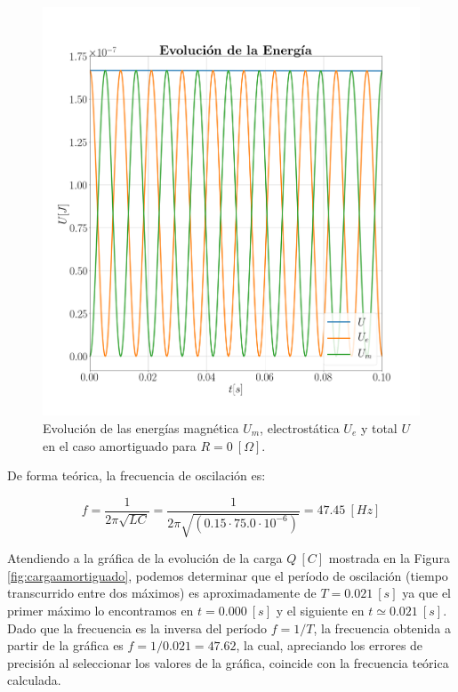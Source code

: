 \documentclass[journal]{IEEEtran}
\begin{document}
\begin{figure}[!htb]
    \centering
    \includegraphics[width=\linewidth,trim={40 70 70 70},clip]{energiaamortiguado.png}
    \caption{Evolución de las energías magnética $U_m$, electrostática $U_e$ y total $U$ en el caso amortiguado para $R=0~[\Omega]$.}
    \label{fig:energiaamortiguado}
\end{figure}

De forma teórica, la frecuencia de oscilación es:

\begin{equation}
f = \frac{1}{2\pi\sqrt{LC}} = \frac{1}{2\pi\sqrt{(0.15 \cdot 75.0 \cdot 10^{-6})}} = 47.45~[Hz]
\end{equation}

Atendiendo a la gráfica de la evolución de la carga $Q~[C]$ mostrada en la Figura \ref{fig:cargaamortiguado}, podemos determinar que el período de oscilación (tiempo transcurrido entre dos máximos) es aproximadamente de $T = 0.021~[s]$ ya que el primer máximo lo encontramos en $t=0.000~[s]$ y el siguiente en $t\simeq 0.021~[s]$. Dado que la frecuencia es la inversa del período $f = 1/T$, la frecuencia obtenida a partir de la gráfica es $f = 1 / 0.021 = 47.62$, la cual, apreciando los errores de precisión al seleccionar los valores de la gráfica, coincide con la frecuencia teórica calculada.
\end{document}
